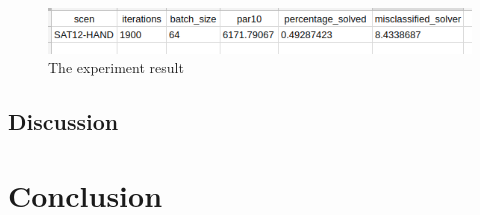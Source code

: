 \documentclass{article}
\begin{document}
    \begin{figure}[htbp!]
        \centering
        \includegraphics[scale=0.6]{./assets/exp_res.png}
        \caption{The experiment result}
        \label{fig:experiment result}
    \end{figure}

\subsection{Discussion}

\section{Conclusion}

\printbibliography
\end{document}

